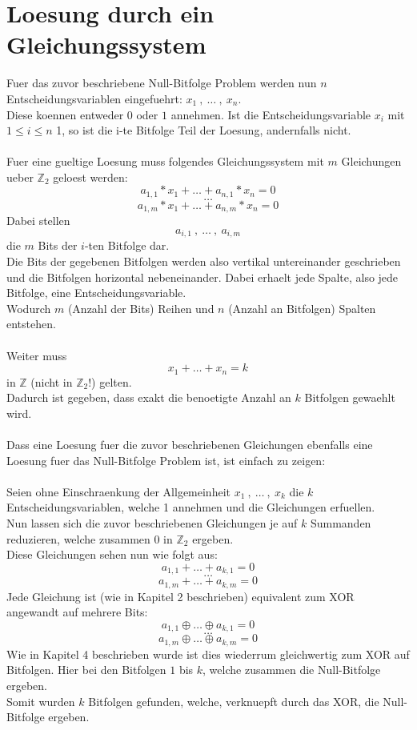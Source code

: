 \documentclass[a4paper,10pt,ngerman]{scrartcl}
\begin{document}
\section{Loesung durch ein Gleichungssystem}
Fuer das zuvor beschriebene Null-Bitfolge Problem werden nun \(n\) Entscheidungsvariablen eingefuehrt: \(x_1 \ , \ \dots \ , \ x_n\).\\
Diese koennen entweder \(0\) oder \(1\) annehmen. Ist die Entscheidungsvariable \(x_i\) mit \(1 \leq i \leq n\) 1, so ist die i-te Bitfolge Teil der Loesung, andernfalls nicht.\\\\
Fuer eine gueltige Loesung muss folgendes Gleichungssystem mit \(m\) Gleichungen ueber \(\mathbb{Z}_{2}\) geloest werden:\\
\[a_{1, 1} * x_1 + \dots + a_{n, 1} * x_n = 0\]
\[\dots\]
\[a_{1, m} * x_1 + \dots + a_{n, m}  * x_n = 0\]
Dabei stellen 
\[a_{i, 1} \ , \ \dots \ , \ a_{i, m}\]
die \(m\) Bits der $i$-ten Bitfolge dar.\\
Die Bits der gegebenen Bitfolgen werden also vertikal untereinander geschrieben und die Bitfolgen horizontal nebeneinander. Dabei erhaelt jede Spalte, also jede Bitfolge, eine Entscheidungsvariable.\\
Wodurch \(m\) (Anzahl der Bits) Reihen und \(n\) (Anzahl an Bitfolgen) Spalten entstehen.\\\\
Weiter muss 
\[x_1 + \dots + x_n = k\]
in \(\mathbb{Z}\) (nicht in \(\mathbb{Z}_{2}\)!) gelten.\\
Dadurch ist gegeben, dass exakt die benoetigte Anzahl an \(k\) Bitfolgen gewaehlt wird.\\\\
Dass eine Loesung fuer die zuvor beschriebenen Gleichungen ebenfalls eine Loesung fuer das Null-Bitfolge Problem ist, ist einfach zu zeigen:\\\\
Seien ohne Einschraenkung der Allgemeinheit \(x_1 \ , \ \dots \ , \ x_{k}\) die \(k\) Entscheidungsvariablen, welche 1 annehmen und die Gleichungen erfuellen.\\
Nun lassen sich die zuvor beschriebenen Gleichungen je auf \(k\) Summanden reduzieren, welche zusammen 0 in \(\mathbb{Z}_{2}\) ergeben.\\
Diese Gleichungen sehen nun wie folgt aus:
\[a_{1, 1} + \dots + a_{k, 1} = 0\]
\[\dots\]
\[a_{1, m} + \dots + a_{k, m} = 0\]
Jede Gleichung ist (wie in Kapitel 2 beschrieben) equivalent zum XOR angewandt auf mehrere Bits:
\[a_{1, 1} \oplus \dots \oplus a_{k, 1} = 0\]
\[\dots\]
\[a_{1, m} \oplus \dots \oplus a_{k, m} = 0\]
Wie in Kapitel 4 beschrieben wurde ist dies wiederrum gleichwertig zum XOR auf Bitfolgen. Hier bei den Bitfolgen \(1\) bis \(k\), welche zusammen die Null-Bitfolge ergeben.\\
Somit wurden \(k\) Bitfolgen gefunden, welche, verknuepft durch das XOR, die Null-Bitfolge ergeben.
\end{document}
